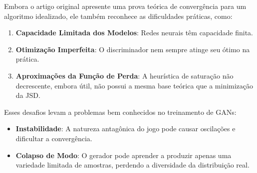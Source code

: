\documentclass{tufte-handout}
\begin{document}
Embora o artigo original apresente uma prova teórica de convergência para um algoritmo idealizado, ele também reconhece as dificuldades práticas, como:

\begin{enumerate}
    \item \textbf{Capacidade Limitada dos Modelos}: Redes neurais têm capacidade finita.
    \item \textbf{Otimização Imperfeita}: O discriminador nem sempre atinge seu ótimo na prática.
    \item \textbf{Aproximações da Função de Perda}: A heurística de saturação não decrescente, embora útil, não possui a mesma base teórica que a minimização da JSD.
\end{enumerate}

Esses desafios levam a problemas bem conhecidos no treinamento de GANs:
\begin{itemize}
    \item \textbf{Instabilidade}: A natureza antagônica do jogo pode causar oscilações e dificultar a convergência.
    \item \textbf{Colapso de Modo}: O gerador pode aprender a produzir apenas uma variedade limitada de amostras, perdendo a diversidade da distribuição real.
\end{itemize}
\end{document}

